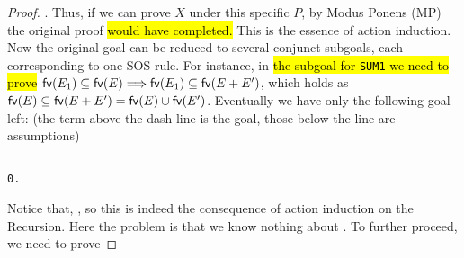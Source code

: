\begin{proof}
. Thus, if we can prove
$X$ under this specific $P$, by Modus Ponens (MP) the original proof
\hl{would have completed.}
This is the essence of action induction.
Now the original goal can be reduced to several conjunct
subgoals, each corresponding to one SOS rule. For instance, in
\hl{the subgoal for \texttt{SUM1} we need to prove}
${{\rm\sf{fv}}}(E_1) \subseteq {{\rm\sf{fv}}}(E) \Longrightarrow
{{\rm\sf{fv}}}(E_1) \subseteq {{\rm\sf{fv}}}(E + E')$, which holds as ${{\rm\sf{fv}}}(E)
\subseteq {{\rm\sf{fv}}}(E + E') = {{\rm\sf{fv}}}(E) \cup {{\rm\sf{fv}}}(E')$. Eventually we have only
the following goal left: (the term above the dash line is the goal,
those below the line are assumptions)
\begin{alltt}
   ------------------------------------
    0.  
\end{alltt}
Notice that, , so
this is indeed the consequence of action induction on the Recursion.
Here the problem is that we know nothing about
. To further proceed, we need to prove

\end{proof}
